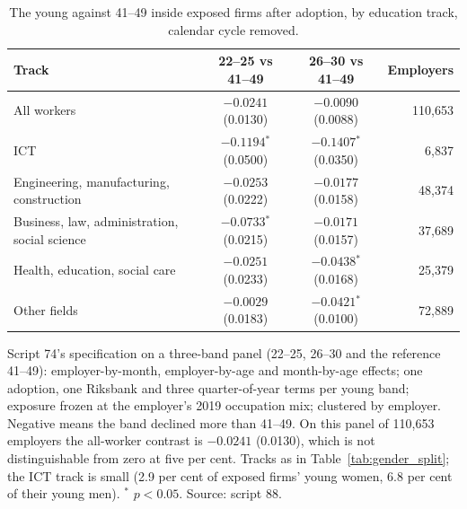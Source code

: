 \begin{table}[ht!]
\centering
\caption{The young against 41--49 inside exposed firms after adoption, by education track, calendar cycle removed.}
\label{tab:contrast_by_track}
\footnotesize
\setlength{\tabcolsep}{3.5pt}
\begin{tabular}{lccr}
\toprule
Track & 22--25 vs 41--49 & 26--30 vs 41--49 & Employers \\
\midrule
All workers & $-0.0241$ (0.0130) & $-0.0090$ (0.0088) & 110,653 \\
ICT & $-0.1194$$^{*}$ (0.0500) & $-0.1407$$^{*}$ (0.0350) & 6,837 \\
Engineering, manufacturing, construction & $-0.0253$ (0.0222) & $-0.0177$ (0.0158) & 48,374 \\
Business, law, administration, social science & $-0.0733$$^{*}$ (0.0215) & $-0.0171$ (0.0157) & 37,689 \\
Health, education, social care & $-0.0251$ (0.0233) & $-0.0438$$^{*}$ (0.0168) & 25,379 \\
Other fields & $-0.0029$ (0.0183) & $-0.0421$$^{*}$ (0.0100) & 72,889 \\
\bottomrule
\end{tabular}
\begin{minipage}{0.92\textwidth}\footnotesize\vspace{4pt}
Script 74's specification on a three-band panel (22--25, 26--30 and the reference 41--49): employer-by-month, employer-by-age and month-by-age effects; one adoption, one Riksbank and three quarter-of-year terms per young band; exposure frozen at the employer's 2019 occupation mix; clustered by employer. Negative means the band declined more than 41--49. On this panel of 110{,}653 employers the all-worker contrast is $-0.0241$ (0.0130), which is not distinguishable from zero at five per cent. Tracks as in Table~\ref{tab:gender_split}; the ICT track is small (2.9 per cent of exposed firms' young women, 6.8 per cent of their young men). $^{*}$ $p<0.05$. Source: script 88.
\end{minipage}
\end{table}
